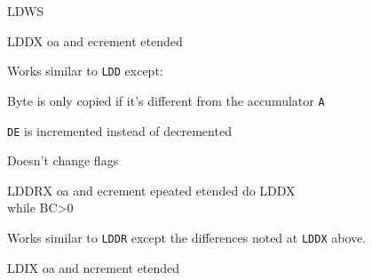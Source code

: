 \begin{basedescript}{
    \desclabelstyle{\multilinelabel}
    \desclabelwidth{3cm}}
\begin{DetailItem}{LDWS\ZXN}
    \end{DetailItem}

    \label{DetailRefLDDX}
    \begin{DetailItem}{LDDX\ZXN}
        {oa and ecrement etended}		
        {\SymLDDX}

        Works similar to {\tt LDD} except:
        \begin{DetailCompactList}
            \item Byte is only copied if it's different from the accumulator {\tt A}
            \item {\tt DE} is incremented instead of decremented
            \item Doesn't change flags
        \end{DetailCompactList}

        \begin{DetailEffects}
            \FlagsLDDX
        \end{DetailEffects}
				
        \begin{DetailTiming}
        \end{DetailTiming}

    \end{DetailItem}

    \label{DetailRefLDDRX}
    \begin{DetailItem}{LDDRX\ZXN}
        {oa and ecrement epeated etended}		
        {do LDDX\\
        while BC>0}

        Works similar to {\tt LDDR} except the differences noted at {\tt LDDX} above.

        \begin{DetailEffects}
            \FlagsLDDRX
        \end{DetailEffects}
					
        \begin{DetailTiming}
        \end{DetailTiming}

    \end{DetailItem}

    \label{DetailRefLDIX}
    \begin{DetailItem}{LDIX\ZXN}
        {oa and ncrement etended}		
        {\SymLDIX}


\end{DetailItem}
\end{basedescript}

